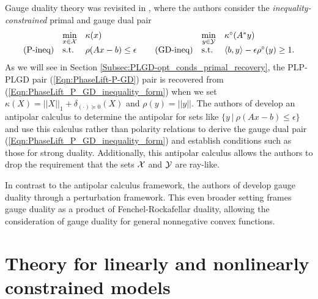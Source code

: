 Gauge duality theory was revisited in \cite{DBLP:journals/siamjo/FriedlanderMP14}, where the authors consider the \textit{inequality-constrained} primal and gauge dual pair
\begin{equation} 			\label{Eqn:PhaseLift_P_GD_inequality_form}
\begin{array}{lllllll}
	&	\min\limits_{\substack{x \in {\mathcal X}}}
		&	\kappa(x)
			&
				&	\min\limits_{\substack{y \in {\mathcal Y}}}
					&	\kappa^\circ(A^*y)
						\\
\textnormal{(P-ineq)}
	&	\textnormal{s.t.}
		& 	\rho(Ax-b) \leq \epsilon
			&	\hspace{0.4cm} 	\textnormal{(GD-ineq)}
				&	\textnormal{s.t.}
					&	\langle b, y \rangle - \epsilon \rho^\circ(y) \geq 1.
\end{array}
\end{equation}
As we will see in Section \ref{Subsec:PLGD-opt_conds_primal_recovery}, the PLP-PLGD pair (\ref{Eqn:PhaseLift-P-GD}) pair is recovered from (\ref{Eqn:PhaseLift_P_GD_inequality_form}) when we set $\kappa(X) = ||X||_1 + \delta_{(\cdot) \succeq 0}(X)$ and $\rho(y) = ||y||$.  The authors of \cite{DBLP:journals/siamjo/FriedlanderMP14} develop an antipolar calculus to determine the antipolar for sets like $\{ y \ | \ \rho(Ax-b) \leq \epsilon \}$ and use this calculus rather than polarity relations to derive the gauge dual pair (\ref{Eqn:PhaseLift_P_GD_inequality_form}) and establish conditions such as those for strong duality.  Additionally, this antipolar calculus allows the authors to drop the requirement that the sets ${\mathcal X}$ and ${\mathcal Y}$ are ray-like.

In contrast to the antipolar calculus framework, the authors of \cite{aravkin2017foundations} develop gauge duality through a perturbation framework.  This even broader setting frames gauge duality as a product of Fenchel-Rockafellar duality, allowing the consideration of gauge duality for 
general nonnegative convex functions.









\section{Theory for linearly and nonlinearly constrained models} 			\label{Subsec:PLGD-theory}






